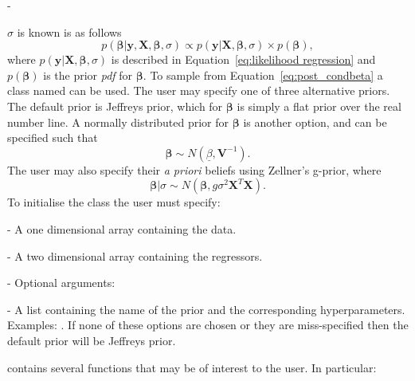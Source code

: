 -\documentclass[article]{jss}
\begin{document}
$\sigma$ is known is as follows
\begin{equation} 
p\left(\bm{\beta}|\bm{y},\bm{X},\bm{\beta},\sigma\right)\propto
  p(\bm{y}|\bm{X},\bm{\beta},\sigma)\times
  p(\bm{\beta}),\label{eq:post_condbeta}
\end{equation} where
$p(\bm{y}|\bm{X},\bm{\beta},\sigma)$ is described in
Equation~\ref{eq:likelihood regression} and $p(\bm{\beta})$ is the prior
\emph{pdf} for $\bm{\beta}.$ To sample from Equation~\ref{eq:post_condbeta} a
class named  can be used. The user may
specify one of three alternative priors.  The default prior is
Jeffreys prior, which for $\bm{\beta}$ is simply a flat prior over
the real number line. A normally distributed prior for $\bm{\beta}$ is
another option, and can be specified such that\[ \bm{\beta}\sim
N\left(\underline{\beta},\bm{V}^{-1}\right).\] The user may also
specify their \emph{a priori} beliefs using Zellner's g-prior, where\[
\bm{\beta}|\sigma\sim
N\left(\bm{\beta},g\sigma^{2}\bm{X}^{T}\bm{X}\right).\] To initialise
the class the user must specify:
\begin{description}
\item {} - A one dimensional  array containing the
  data.
\item {} - A two dimensional  array containing the
  regressors.
\item {} - Optional arguments:

\begin{description}
\item {} - A list containing the name of the prior and the
  corresponding hyperparameters. Examples: \newline
  . \newline If none of these options are chosen or
  they are miss-specified then the default prior will be Jeffreys
  prior.
\end{description}
\end{description}
 contains several functions that may be of
interest to the user. In particular:
\end{document}
